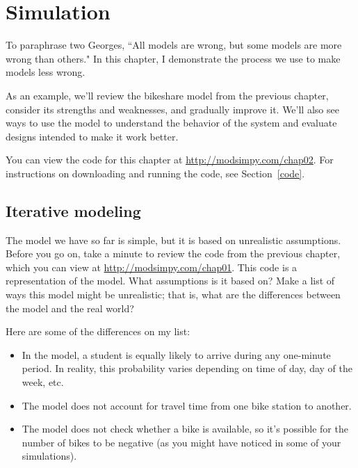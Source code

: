 \documentclass[12pt]{book}
\theoremstyle{exercise}
\begin{document}
\chapter{Simulation}

To paraphrase two Georges, ``All models are wrong, but some models are more wrong than others."  In this chapter, I demonstrate the process we use to make models less wrong.


As an example, we'll review the bikeshare model from the previous chapter, consider its strengths and weaknesses, and gradually improve it.  We'll also see ways to use the model to understand the behavior of the system and evaluate designs intended to make it work better.


You can view the code for this chapter at \url{http://modsimpy.com/chap02}.  For instructions on downloading and running the code, see Section~\ref{code}.


\section{Iterative modeling}

The model we have so far is simple, but it is based on unrealistic assumptions.  Before you go on, take a minute to review the code from the previous chapter, which you can view at \url{http://modsimpy.com/chap01}.  This code is a representation of the model.  What assumptions is it based on?  Make a list of ways this model might be unrealistic; that is, what are the differences between the model and the real world?

Here are some of the differences on my list:

\begin{itemize}

\item In the model, a student is equally likely to arrive during any one-minute period.  In reality, this probability varies depending on time of day, day of the week, etc.


\item The model does not account for travel time from one bike station to another.

\item The model does not check whether a bike is available, so it's possible for the number of bikes to be negative (as you might have noticed in some of your simulations).

\end{itemize}
\end{document}
